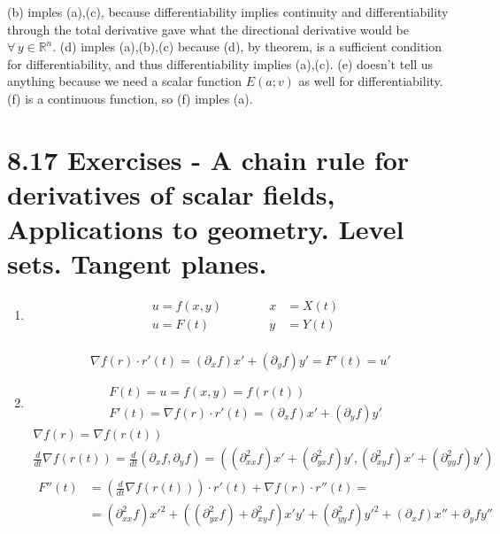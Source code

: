 \documentclass[twoside]{amsart}
\theoremstyle{plain}
\theoremstyle{definition}
\newcommand{\exercisehead}[1]
  {
   \noindent{\small\bf Exercise #1.}
   \smallskip}
\begin{document}
(b) imples (a),(c), because differentiability implies continuity and differentiability through the total derivative gave what the directional derivative would be $\forall \, y \in \mathbb{R}^n$.  (d) imples (a),(b),(c) because (d), by theorem, is a sufficient condition for differentiability, and thus differentiability implies (a),(c).  (e) doesn't tell us anything because we need a scalar function $E(a;v)$ as well for differentiability.  (f) is a continuous function, so (f) imples (a).  

\section*{ 8.17 Exercises - A chain rule for derivatives of scalar fields, Applications to geometry.  Level sets.  Tangent planes. }

\exercisehead{1} 
\begin{enumerate}
\item \[ \begin{aligned}
  & u = f(x,y) \\
  & u = F(t)
\end{aligned} \quad \quad \quad \begin{aligned} 
  x & = X(t) \\
  y & = Y(t) 
\end{aligned} \] \\
  \[
\nabla f(r) \cdot r'(t) = (\partial_x f) x' + (\partial_y f)y' = F'(t) = u'
\]
\item 
\[
\begin{aligned}
  & F(t) = u = f(x,y) = f(r(t)) \\
  & F'(t) = \nabla f(r) \cdot r'(t) = (\partial_x f) x' + (\partial_y f) y' 
\end{aligned}
\]
\[
\begin{gathered}
  \nabla f(r) = \nabla f(r(t)) \\
  \frac{d}{dt} \nabla f(r(t)) = \frac{d}{dt} (\partial_x f, \partial_y f) = ((\partial_{xx}^2 f) x' + (\partial_{yx}^2 f) y', (\partial_{xy}^2 f) x' + (\partial_{yy}^2 f) y' ) \\
  \begin{aligned}
    F''(t) & = \left( \frac{d}{dt} \nabla f(r(t)) \right) \cdot r'(t) + \nabla f(r) \cdot r''(t) = \\
    & = (\partial_{xx}^2 f) x'^2 + \left( (\partial^2_{yx} f) + \partial^2_{xy} f \right) x'y' + (\partial_{yy}^2 f) y'^2 + (\partial_x f) x'' + \partial_y f y''
  \end{aligned}
\end{gathered}
\]
\end{enumerate}
\end{document}
